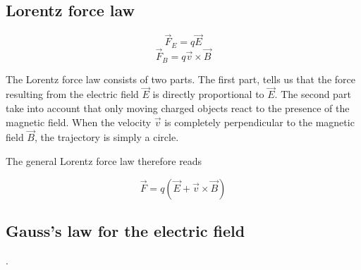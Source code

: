 \subsection{Lorentz force law}
\begin{qt}
    \begin{equation}
\vec{F}_{E}=q \vec{E}
\end{equation}
\begin{equation}
\vec{F}_{B}=q \vec{v} \times \vec{B}
\end{equation}
\end{qt}
The Lorentz force law consists of two parts. The first part, tells us that the force resulting from the electric field $\vec{E}$ is directly proportional to $\vec{E}$. The second part take into account that only moving charged objects react to the presence of the magnetic field. When the velocity $\vec{v}$ is completely perpendicular to the magnetic field $\vec{B}$, the trajectory is simply a circle.

The general Lorentz force law therefore reads
\begin{qt}
    \begin{equation}
\vec{F}=q(\vec{E}+\vec{v} \times \vec{B})
\end{equation}
\end{qt}

\subsection{Gauss's law for the electric field}
\textbf{}.

